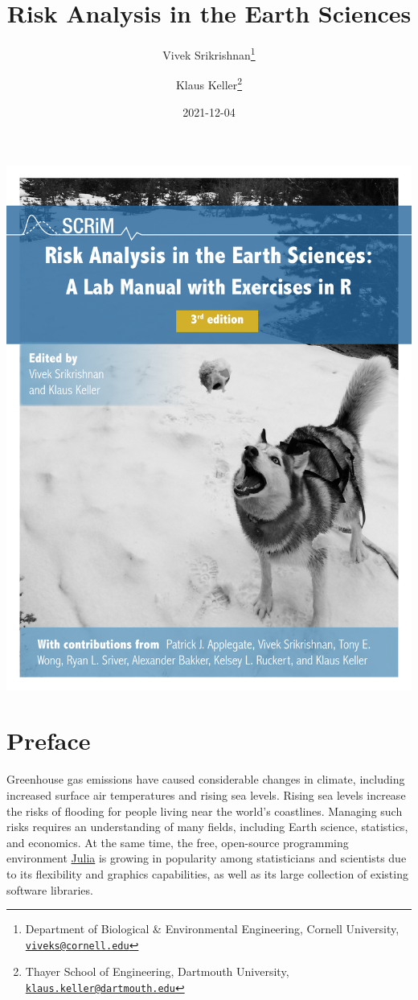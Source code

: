 \documentclass[
  11pt,
]{book}
\title{Risk Analysis in the Earth Sciences}
\author{Vivek Srikrishnan\footnote{Department of Biological \& Environmental Engineering, Cornell University, \href{mailto:viveks@cornell.edu}{\nolinkurl{viveks@cornell.edu}}} \and Klaus Keller\footnote{Thayer School of Engineering, Dartmouth University, \href{mailto:klaus.keller@dartmouth.edu}{\nolinkurl{klaus.keller@dartmouth.edu}}}}
\date{2021-12-04}
\begin{document}
\begin{center}
\includegraphics{images/cover_with_alexander.pdf}
\end{center}
\thispagestyle{empty}

\clearpage

\restoregeometry


\maketitle


{
\hypersetup{linkcolor=}
\setcounter{tocdepth}{2}
\tableofcontents
}
\hypertarget{preface}{%
\chapter*{Preface}\label{preface}}


Greenhouse gas emissions have caused considerable changes in climate, including increased surface air temperatures and rising sea levels. Rising sea levels increase the risks of flooding for people living near the world's coastlines. Managing such risks requires an understanding of many fields, including Earth science, statistics, and economics. At the same time, the free, open-source programming environment \href{http://www.julialang.org}{Julia} is growing in popularity among statisticians and scientists due to its flexibility and graphics capabilities, as well as its large collection of existing software libraries.
\end{document}
